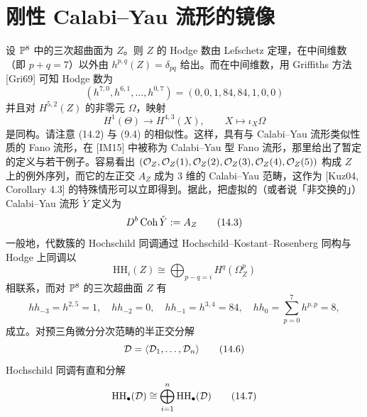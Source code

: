 \section{刚性 Calabi–Yau 流形的镜像}

设 $\mathbb{P}^8$ 中的三次超曲面为 $Z$。则 $Z$ 的 Hodge 数由 Lefschetz 定理，在中间维数（即 $p+q=7$）以外由 $h^{p,q}(Z)=\delta_{pq}$ 给出。而在中间维数，用 Griffiths 方法 [Gri69] 可知 Hodge 数为
\begin{equation}
    (h^{7,0},h^{6,1},\dots,h^{0,7})=(0,0,1,84,84,1,0,0) \tag{14.1}
\end{equation}
并且对 $H^{5,2}(Z)$ 的非零元 $\Omega$，映射
\begin{equation}
    H^1(\Theta)\to H^{4,3}(X),\qquad X\mapsto \iota_X\Omega \tag{14.2}
\end{equation}
是同构。请注意 (14.2) 与 (9.4) 的相似性。这样，具有与 Calabi–Yau 流形类似性质的 Fano 流形，在 [IM15] 中被称为 Calabi–Yau 型 Fano 流形，那里给出了暂定的定义与若干例子。容易看出 $(\mathcal{O}_Z,\mathcal{O}_Z(1),\mathcal{O}_Z(2),\mathcal{O}_Z(3),\mathcal{O}_Z(4),\mathcal{O}_Z(5))$ 构成 $Z$ 上的例外序列，而它的左正交 $A_Z$ 成为 3 维的 Calabi–Yau 范畴，这作为 [Kuz04, Corollary 4.3] 的特殊情形可以立即得到。据此，把虚拟的（或者说「非交换的」）Calabi–Yau 流形 $\check Y$ 定义为
\begin{equation}
    D^b\operatorname{Coh}\check Y := A_Z \tag{14.3}
\end{equation}
一般地，代数簇的 Hochschild 同调通过 Hochschild–Kostant–Rosenberg 同构与 Hodge 上同调以
\begin{equation}
    \mathrm{HH}_i(Z)\cong \bigoplus_{p-q=i} H^q(\Omega^p_Z) \tag{14.4}
\end{equation}
相联系，而对 $\mathbb{P}^8$ 的三次超曲面 $Z$ 有
\begin{equation}
    hh_{-3}=h^{2,5}=1,\quad hh_{-2}=0,\quad hh_{-1}=h^{3,4}=84,\quad hh_0=\sum_{p=0}^{7}h^{p,p}=8, \tag{14.5}
\end{equation}
成立。对预三角微分分次范畴的半正交分解
\begin{equation}
    \mathcal{D}=\langle \mathcal{D}_1,\dots,\mathcal{D}_n\rangle \tag{14.6}
\end{equation}
Hochschild 同调有直和分解
\begin{equation}
    \mathrm{HH}_\bullet(\mathcal{D})\cong \bigoplus_{i=1}^{n}\mathrm{HH}_\bullet(\mathcal{D}) \tag{14.7}
\end{equation}
